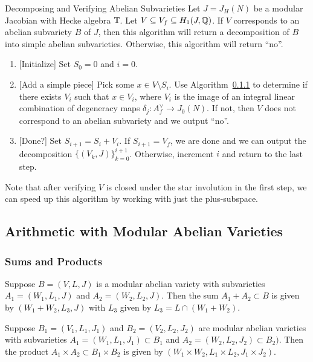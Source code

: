 \documentclass{article}
\begin{document}
\begin{algorithm}{Decomposing and Verifying Abelian Subvarieties}
    \label{alg:decomp_and_verify_subvarieties}
    Let $J=J_H(N)$ be a modular Jacobian with Hecke algebra $\mathbb{T}$. Let
    $V\subseteq V_f \subseteq H_1(J, \mathbb{Q})$. If $V$ corresponds to an abelian
    subvariety $B$ of $J$, then this algorithm will return a decomposition of
    $B$ into simple abelian subvarieties. Otherwise, this algorithm will return
    ``no''.
    \begin{enumerate}
        \item{} [Initialize]
            Set $S_0=0$ and $i=0$.
        \item{} [Add a simple piece]
            Pick some $x\in V\setminus S_i$. Use Algorithm~\ref{} to determine
            if there exists $V_i$ such that $x\in V_i$, where $V_i$ is the
            image of an integral linear combination of degeneracy maps
            $\delta_j:A_f ^\vee\to J_0(N)$. If not, then $V$ does not
            correspond to an abelian subvariety and we output ``no''.
        \item{} [Done?]
            Set $S_{i+1}=S_i + V_i$. If $S_{i+1} = V_f$, we are done and we can
            output the decomposition $\{(V_k, J)\}_{k=0} ^{i+1}$. Otherwise,
            increment $i$ and return to the last step.
    \end{enumerate}
\end{algorithm}

Note that after verifying $V$ is closed under the star involution in the first
step, we can speed up this algorithm by working with just the plus-subspace. 

\subsection{Arithmetic with Modular Abelian Varieties}

\subsubsection{Sums and Products}

Suppose $B=(V, L, J)$ is a modular abelian variety with subvarieties $A_1=(W_1,
L_1, J)$ and $A_2=(W_2, L_2, J)$. Then the sum $A_1+A_2\subset B$ is given by
$(W_1+W_2, L_3, J)$ with $L_3$ given by $L_3 = L\cap (W_1+W_2)$.

Suppose $B_1=(V_1, L_1, J_1)$ and $B_2=(V_2, L_2, J_2)$ are modular abelian
varieties with subvarieties $A_1=(W_1, L_1, J_1)\subset B_1$ and $A_2=(W_2,
L_2, J_2)\subset B_2)$. Then the product $A_1\times A_2\subset B_1\times
B_2$ is given by $(W_1\times W_2, L_1\times L_2, J_1\times J_2)$.
\end{document}
